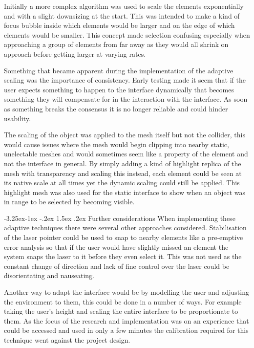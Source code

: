 \documentclass[12pt]{article}
\makeatletter
\renewcommand{\subsubsection}{\@startsection{subsubsection}{2}{\z@}%
             {-3.25ex\@plus -1ex \@minus -.2ex}%
             {1.5ex \@plus .2ex}%
             {\normalfont\normalsize\scshape\bfseries}}
\makeatother
\begin{document}
Initially a more complex algorithm was used to scale the elements exponentially and with a slight downsizing at the start. This was intended to make a kind of focus bubble inside which elements would be larger and on the edge of which elements would be smaller. This concept made selection confusing especially when approaching a group of elements from far away as they would all shrink on approach before getting larger at varying rates.

Something that became apparent during the implementation of the adaptive scaling was the importance of consistency. Early testing made it seem that if the user expects something to happen to the interface dynamically that becomes something they will compensate for in the interaction with the interface. As soon as something breaks the consensus it is no longer reliable and could hinder usability.

The scaling of the object was applied to the mesh itself but not the collider, this would cause issues where the mesh would begin clipping into nearby static, unelectable meshes and would sometimes seem like a property of the element and not the interface in general. By simply adding a kind of highlight replica of the mesh with transparency and scaling this instead, each element could be seen at its native scale at all times yet the dynamic scaling could still be applied. This highlight mesh was also used for the static interface to show when an object was in range to be selected by becoming visible.

\subsubsection{Further considerations}
When implementing these adaptive techniques there were several other approaches considered. Stabilisation of the laser pointer could be used to snap to nearby elements like a pre-emptive error analysis so that if the user would have slightly missed an element the system snaps the laser to it before they even select it. This was not used as the constant change of direction and lack of fine control over the laser could be disorientating and nauseating.

Another way to adapt the interface would be by modelling the user and adjusting the environment to them, this could be done in a number of ways. For example taking the user's height and scaling the entire interface to be proportionate to them. As the focus of the research and implementation was on an experience that could be accessed and used in only a few minutes the calibration required for this technique went against the project design.
\end{document}
